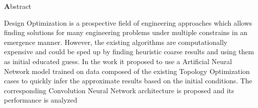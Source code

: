 
\clearemptydoublepage
{}
{}

\vspace*{2cm}
\begin{center}
{\Large \textbf Abstract}
\end{center}
\vspace{1cm}

Design Optimization is a prospective field of engineering approaches which allows finding solutions for many engineering problems under multiple constrains in an emergence manner.
However, the existing algorithms are computationally expensive and could be sped up by finding heuristic coarse results and using them as initial educated guess.
In the work it proposed to use a Artificial Neural Network model trained on data composed of the existing Topology Optimization cases to quickly infer the approximate results based on the initial conditions. The corresponding Convolution Neural Network architecture is proposed and its performance is analyzed

